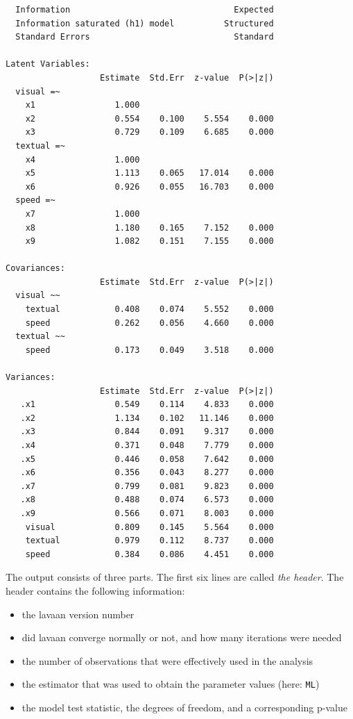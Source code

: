 \begin{verbatim}
  Information                                 Expected
  Information saturated (h1) model          Structured
  Standard Errors                             Standard

Latent Variables:
                   Estimate  Std.Err  z-value  P(>|z|)
  visual =~                                           
    x1                1.000                           
    x2                0.554    0.100    5.554    0.000
    x3                0.729    0.109    6.685    0.000
  textual =~                                          
    x4                1.000                           
    x5                1.113    0.065   17.014    0.000
    x6                0.926    0.055   16.703    0.000
  speed =~                                            
    x7                1.000                           
    x8                1.180    0.165    7.152    0.000
    x9                1.082    0.151    7.155    0.000

Covariances:
                   Estimate  Std.Err  z-value  P(>|z|)
  visual ~~                                           
    textual           0.408    0.074    5.552    0.000
    speed             0.262    0.056    4.660    0.000
  textual ~~                                          
    speed             0.173    0.049    3.518    0.000

Variances:
                   Estimate  Std.Err  z-value  P(>|z|)
   .x1                0.549    0.114    4.833    0.000
   .x2                1.134    0.102   11.146    0.000
   .x3                0.844    0.091    9.317    0.000
   .x4                0.371    0.048    7.779    0.000
   .x5                0.446    0.058    7.642    0.000
   .x6                0.356    0.043    8.277    0.000
   .x7                0.799    0.081    9.823    0.000
   .x8                0.488    0.074    6.573    0.000
   .x9                0.566    0.071    8.003    0.000
    visual            0.809    0.145    5.564    0.000
    textual           0.979    0.112    8.737    0.000
    speed             0.384    0.086    4.451    0.000
\end{verbatim}

The output consists of three parts. The first six lines are called
\emph{the header}. The header contains the following information:

\begin{itemize}
\tightlist
\item
  the lavaan version number
\item
  did lavaan converge normally or not, and how many iterations were
  needed
\item
  the number of observations that were effectively used in the analysis
\item
  the estimator that was used to obtain the parameter values (here:
  \texttt{ML})
\item
  the model test statistic, the degrees of freedom, and a corresponding
  p-value
\end{itemize}

